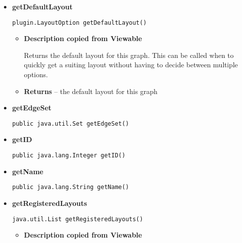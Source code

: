{{{{{{{{{{{{{{{\begin{itemize}
{\begin{itemize}
{Expands a collapsed vertex into its substituted set of vertices The vertices will be added back to the set of vertices of this graph. The compound vertex will be removed from the set of vertices. All to the compound vertex incident edges, will be resolved back into an edge between the vertices it connected before the collapse.
}
\item{
{\bf  Parameters}
  \begin{itemize}
   \item{
\texttt{vertex} -- the collapsed vertex to expand}
  \end{itemize}
}%
\item{{\bf  Returns} -- 
the set of vertices which was substituted by the collapsed vertex 
}%
\end{itemize}
}%
\item{ 
{\bf  getDefaultLayout}\\
\begin{lstlisting}[frame=none]
plugin.LayoutOption getDefaultLayout()\end{lstlisting} %
\begin{itemize}
\item{
{\bf  Description copied from Viewable{\small {}} }

Returns the default layout for this graph. This can be called when to quickly get a suiting layout without having to decide between multiple options.
}
\item{{\bf  Returns} -- 
the default layout for this graph 
}%
\end{itemize}
}%
\item{ 
{\bf  getEdgeSet}\\
\begin{lstlisting}[frame=none]
public java.util.Set getEdgeSet()\end{lstlisting} %
}%
\item{ 
{\bf  getID}\\
\begin{lstlisting}[frame=none]
public java.lang.Integer getID()\end{lstlisting} %
}%
\item{ 
{\bf  getName}\\
\begin{lstlisting}[frame=none]
public java.lang.String getName()\end{lstlisting} %
}%
\item{ 
{\bf  getRegisteredLayouts}\\
\begin{lstlisting}[frame=none]
java.util.List getRegisteredLayouts()\end{lstlisting} %
\begin{itemize}
\item{
{\bf  Description copied from Viewable{\small {}} }

}
\end{itemize}}
\end{itemize}}}}}}}}}}}}}}}}
